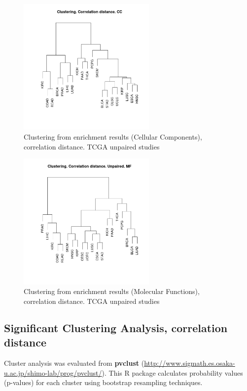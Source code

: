 \documentclass[a4paper,12pt]{article}
\begin{document}
\begin{figure}[!h] 
\centering 
\includegraphics[width=0.6\textwidth]{img/cluster_corelationd_cc_unpaired.png} 
\caption{Clustering from enrichment results (Cellular Components), correlation distance.  TCGA unpaired studies} 
\label{figCLUST_corr_cc_unpaired} 
\end{figure} 

\begin{figure}[!h] 
\centering 
\includegraphics[width=0.6\textwidth]{img/cluster_corelationd_mf_unpaired.png} 
\caption{Clustering from enrichment results (Molecular Functions), correlation distance.  TCGA unpaired studies} 
\label{figCLUST_corr_mf_unpaired} 
\end{figure} 
\clearpage

\subsection{Significant Clustering Analysis, correlation distance}
Cluster analysis was evaluated from \textbf{pvclust} (\url{http://www.sigmath.es.osaka-u.ac.jp/shimo-lab/prog/pvclust/}). 
This R package calculates probability values (p-values) for each cluster using bootstrap resampling techniques.
\end{document}
